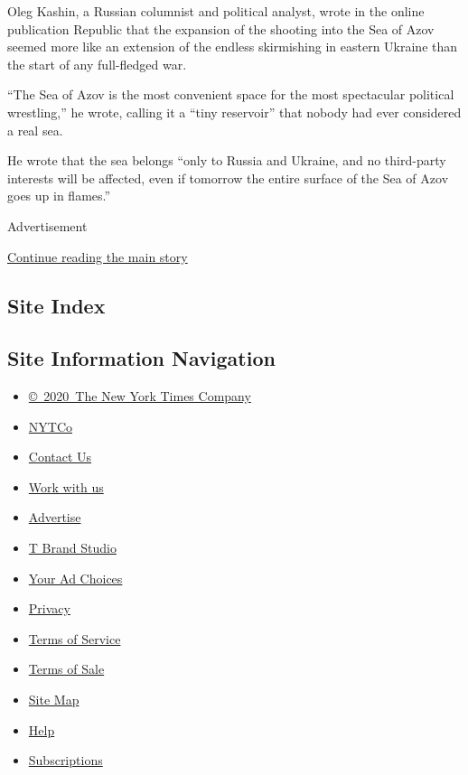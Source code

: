 Oleg Kashin, a Russian columnist and political analyst, wrote in the
online publication Republic that the expansion of the shooting into the
Sea of Azov seemed more like an extension of the endless skirmishing in
eastern Ukraine than the start of any full-fledged war.

``The Sea of Azov is the most convenient space for the most spectacular
political wrestling,'' he wrote, calling it a ``tiny reservoir'' that
nobody had ever considered a real sea.

He wrote that the sea belongs ``only to Russia and Ukraine, and no
third-party interests will be affected, even if tomorrow the entire
surface of the Sea of Azov goes up in flames.''

Advertisement

\protect\hyperlink{after-bottom}{Continue reading the main story}

\hypertarget{site-index}{%
\subsection{Site Index}\label{site-index}}

\hypertarget{site-information-navigation}{%
\subsection{Site Information
Navigation}\label{site-information-navigation}}

\begin{itemize}
\tightlist
\item
  \href{https://help.nytimes.com/hc/en-us/articles/115014792127-Copyright-notice}{©~2020~The
  New York Times Company}
\end{itemize}

\begin{itemize}
\tightlist
\item
  \href{https://www.nytco.com/}{NYTCo}
\item
  \href{https://help.nytimes.com/hc/en-us/articles/115015385887-Contact-Us}{Contact
  Us}
\item
  \href{https://www.nytco.com/careers/}{Work with us}
\item
  \href{https://nytmediakit.com/}{Advertise}
\item
  \href{http://www.tbrandstudio.com/}{T Brand Studio}
\item
  \href{https://www.nytimes.com/privacy/cookie-policy\#how-do-i-manage-trackers}{Your
  Ad Choices}
\item
  \href{https://www.nytimes.com/privacy}{Privacy}
\item
  \href{https://help.nytimes.com/hc/en-us/articles/115014893428-Terms-of-service}{Terms
  of Service}
\item
  \href{https://help.nytimes.com/hc/en-us/articles/115014893968-Terms-of-sale}{Terms
  of Sale}
\item
  \href{https://spiderbites.nytimes.com}{Site Map}
\item
  \href{https://help.nytimes.com/hc/en-us}{Help}
\item
  \href{https://www.nytimes.com/subscription?campaignId=37WXW}{Subscriptions}
\end{itemize}
